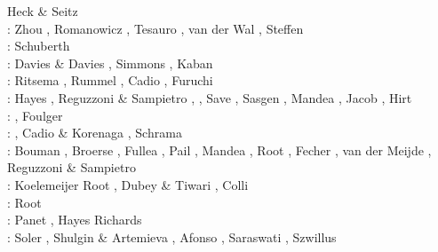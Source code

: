 \begin{scriptsize}
                   Heck \& Seitz \cite{hese07}\\
\twothousandeight: Zhou \cite{zhou08}, Romanowicz \cite{roma08}, 
                   Tesauro \etal \cite{tekc08}, van der Wal \cite{vaws08}, 
                   Steffen \etal \cite{stdm08}\\
\twothousandnine: Schuberth \etal \cite{scbr09}\\
\twothousandten: Davies \& Davies \cite{dada10}, Simmons \etal \cite{sifb10}, 
                 Kaban \etal \cite{katc10}\\
\twothousandeleven: Ritsema \etal \cite{ridv11}, Rummel \etal \cite{ruys11}, 
                    Cadio \etal \cite{capd11}, Furuchi \cite{furu11}\\
\twothousandtwelve: Hayes \etal \cite{hawj12}, Reguzzoni \& Sampietro \cite{resa12},
                    \cite{fesw12}\cite{simj12}\cite{beck12}\cite{pahk12}, 
                    Save \etal \cite{sabt12}, Sasgen \etal \cite{sakm12}, 
                    Mandea \etal \cite{mapl12}, Jacob \etal \cite{jawp12},
                    Hirt \etal \cite{hick12}\\
\twothousandthirteen: \cite{ress13}\cite{ebbf13}\cite{davi13}\cite{scle13}\cite{waja13}, 
                      Foulger \etal \cite{fopa13}\\
\twothousandfourteen: \cite{paml14}\cite{ebbf14}\cite{krbk14}\cite{licl14}\cite{aubb14}, 
                      Cadio \& Korenaga \cite{cako14}, Schrama \etal \cite{scwr14}\\
\twothousandfifteen: Bouman \etal \cite{boem15}, Broerse \etal \cite{brrs15}, 
                     Fullea \etal \cite{furc15}, Pail \etal \cite{pabb15},
                     Mandea \etal \cite{manp15}, Root \etal \cite{rotv15},
                     Fecher \etal \cite{fepg15}, van der Meijde \etal \cite{vapb15},
                     Reguzzoni \& Sampietro \cite{resa15}\\
\twothousandsixteen: Koelemeijer \etal \cite{kord16}
                     Root \etal \cite{rond16}, 
                     Dubey \& Tiwari \cite{duti16}, Colli \etal \cite{cogb16}\\
\twothousandseventeen: Root \etal \cite{roev17}\\
\twothousandeighteen: Panet \etal \cite{pabn18}, Hayes \etal \cite{hamp18}
                      Richards \etal \cite{rihc18}\\
\twothousandnineteen: Soler \etal \cite{sopg19}, Shulgin \& Artemieva \cite{shar19}, 
                      Afonso \etal \cite{afss19}, 
                      Saraswati \cite{sacm19}, Szwillus \etal \cite{szae19}\\
\end{scriptsize}

